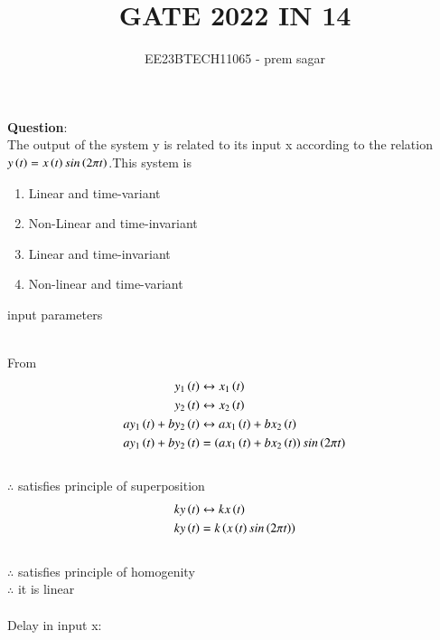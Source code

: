 \documentclass[journal,12pt,twocolumn]{IEEEtran}
\theoremstyle{remark}
\begin{document}

\vspace{3cm}

\title{GATE 2022 IN 14}
\author{EE23BTECH11065 - prem sagar}
\maketitle
\newpage

\bigskip

\renewcommand{\thefigure}{\theenumi}
\renewcommand{\thetable}{\theenumi}
\textbf{Question}:
\\The output of the system y is related to its input x according to the relation $y\left(t\right)=x\left(t\right)sin\left(2\pi t\right)$.This system is 
\renewcommand{\labelenumi}{\alph{enumi})}
\begin{enumerate}
\item Linear and time-variant
\item Non-Linear and time-invariant
\item Linear and time-invariant
\item Non-linear and time-variant
\end{enumerate}
\solution
\fi
\begin{table}[!ht]
\def\arraystretch{1.5}
   \centering
    \renewcommand\thetable{1}
      
    \caption{input parameters}
    \label{tab:IN 14}
 \end{table}
\\ From 
\\\begin{align}
y_1\left(t\right)&\leftrightarrow x_1\left(t\right)
\\y_2\left(t\right)&\leftrightarrow x_2\left(t\right)
\\ay_1\left(t\right)+by_2\left(t\right)&\leftrightarrow ax_1\left(t\right)+bx_2\left(t\right)
\\ay_1\left(t\right)+by_2\left(t\right)&=\left(ax_1\left(t\right)+bx_2\left(t\right)\right)sin\left(2\pi t\right)
\end{align}
\\$\therefore$ satisfies principle of superposition
\begin{align}
ky\left(t\right)&\leftrightarrow kx\left(t\right)
\\ky\left(t\right)&=k\left(x\left(t\right)sin\left(2\pi t\right)\right)
\end{align}
\\$\therefore$ satisfies principle of homogenity
\\$\therefore$ it is linear
\\\\Delay in input x:
\end{document}
